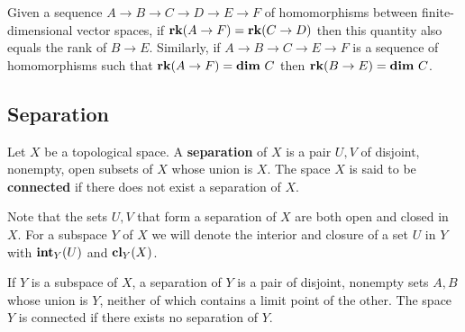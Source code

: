 %

\begin{lemma}\label{lem:sandwich}
    Given a sequence $A\to B\to C\to D\to E\to F$ of homomorphisms between finite-dimensional vector spaces, if $\mathbf{rk}(A\to F) = \mathbf{rk}(C\to D)$ then this quantity also equals the rank of $B\to E$.
    Similarly, if $A\to B\to C\to E\to F$ is a sequence of homomorphisms such that $\mathbf{rk}(A\to F) = \mathbf{dim}~C$ then $\mathbf{rk}(B\to E) = \mathbf{dim}~C$.
\end{lemma}


\subsection{Separation}

\begin{definition}
  Let $X$ be a topological space. A \textbf{separation} of $X$ is a pair $U, V$ of disjoint, nonempty, open subsets of $X$ whose union is $X$.
  The space $X$ is said to be \textbf{connected} if there does not exist a separation of $X$.
\end{definition}

Note that the sets $U, V$ that form a separation of $X$ are both open and closed in $X$.
For a subspace $Y$ of $X$ we will denote the interior and closure of a set $U$ in $Y$ with $\mathbf{int}_Y(U)$ and $\mathbf{cl}_Y(X)$.

\begin{lemma}
  If $Y$ is a subspace of $X$, a separation of $Y$ is a pair of disjoint, nonempty sets $A, B$ whose union is $Y$, neither of which contains a limit point of the other.
  The space $Y$ is connected if there exists no separation of $Y$.
\end{lemma}

